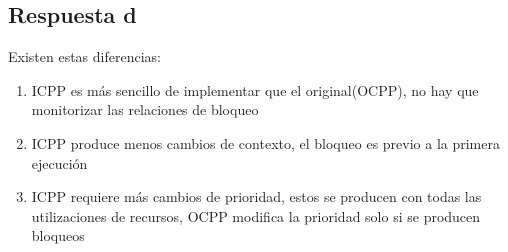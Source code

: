 \documentclass[a4paper,10pt]{article}
\begin{document}
\subsection{Respuesta d}

Existen estas diferencias:

\begin{enumerate}
	\item ICPP es más sencillo de implementar que el original(OCPP), no hay
		que monitorizar las relaciones de bloqueo
	\item ICPP produce menos cambios de contexto, el bloqueo es previo a la
		primera ejecución
	\item ICPP requiere más cambios de prioridad, estos se producen con
		todas las utilizaciones de recursos, OCPP modifica la prioridad
		solo si se producen bloqueos
\end{enumerate}
\end{document}
